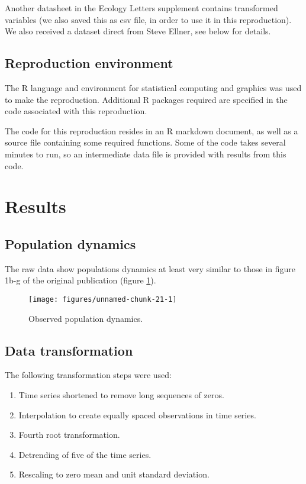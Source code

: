 \documentclass[10pt,a4paper,onecolumn]{article}
\newcommand{\tightlist}{%
  \setlength{\itemsep}{1pt}\setlength{\parskip}{0pt}\setlength{\parsep}{0pt}}
\renewcommand{\includegraphics}[2][]{\OldIncludegraphics[width=12cm, #1]{#2}}
\begin{document}
Another datasheet in the Ecology Letters supplement contains transformed
variables (we also saved this as csv file, in order to use it in this
reproduction). We also received a dataset direct from Steve Ellner, see
below for details.

\subsection{Reproduction environment}\label{reproduction-environment}

The R language and environment for statistical computing and graphics
was used to make the reproduction. Additional R packages required are
specified in the code associated with this reproduction.

The code for this reproduction resides in an R markdown document, as
well as a source file containing some required functions. Some of the
code takes several minutes to run, so an intermediate data file is
provided with results from this code.

\section{Results}\label{results}

\subsection{Population dynamics}\label{population-dynamics}

The raw data show populations dynamics at least very similar to those in
figure 1b-g of the original publication (figure \ref{fig:dynamics}).

\begin{figure}[htbp]
\centering
\texttt{[image: figures/unnamed-chunk-21-1]}
\caption{\label{fig:dynamics}Observed population dynamics.}
\end{figure}

\subsection{Data transformation}\label{data-transformation}

The following transformation steps were used:

\begin{enumerate}
\def\labelenumi{\arabic{enumi}.}
\tightlist
\item
  Time series shortened to remove long sequences of zeros.
\item
  Interpolation to create equally spaced observations in time series.
\item
  Fourth root transformation.
\item
  Detrending of five of the time series.
\item
  Rescaling to zero mean and unit standard deviation.
\end{enumerate}
\end{document}
